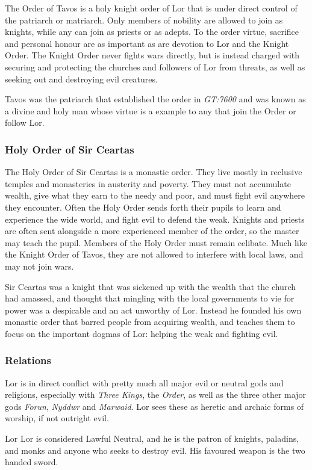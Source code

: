 The Order of Tavos is a holy knight order of Lor that is under direct control
of the patriarch or matriarch. Only members of nobility are allowed to join as
knights, while any can join as priests or as adepts. To the order virtue,
sacrifice and personal honour are as important as are devotion to Lor and the
Knight Order. The Knight Order never fights wars directly, but is instead
charged with securing and protecting the churches and followers of Lor from
threats, as well as seeking out and destroying evil creatures.

Tavos was the patriarch that established the order in \emph{GT:7600} and was
known as a divine and holy man whose virtue is a example to any that join
the Order or follow Lor.

\subsubsection*{Holy Order of Sir Ceartas}

The Holy Order of Sir Ceartas is a monastic order. They live mostly in
reclusive temples and monasteries in austerity and poverty. They must not
accumulate wealth, give what they earn to the needy and poor, and must fight
evil anywhere they encounter. Often the Holy Order sends forth their pupils to
learn and experience the wide world, and fight evil to defend the
weak. Knights and priests are often sent alongside a more experienced member
of the order, so the master may teach the pupil. Members of the Holy Order
must remain celibate. Much like the Knight Order of Tavos, they are not
allowed to interfere with local laws, and may not join wars.

Sir Ceartas was a knight that was sickened up with the wealth that the church
had amassed, and thought that mingling with the local governments to vie for
power was a despicable and an act unworthy of Lor. Instead he founded his own
monastic order that barred people from acquiring wealth, and teaches them to
focus on the important dogmas of Lor: helping the weak and fighting evil.

\subsubsection*{Relations}

Lor is in direct conflict with pretty much all major evil or neutral gods and
religions, especially with \emph{Three Kings}, the \emph{Order}, as well as
the three other major gods \emph{Forun}, \emph{Nyddwr} and \emph{Marwaid}. Lor
sees these as heretic and archaic forms of worship, if not outright evil.

\begin{35e}{Lor}
  Lor is considered Lawful Neutral, and he is the patron of knights, paladins,
  and monks and anyone who seeks to destroy evil. His favoured weapon is the
  two handed sword.
\end{35e}
